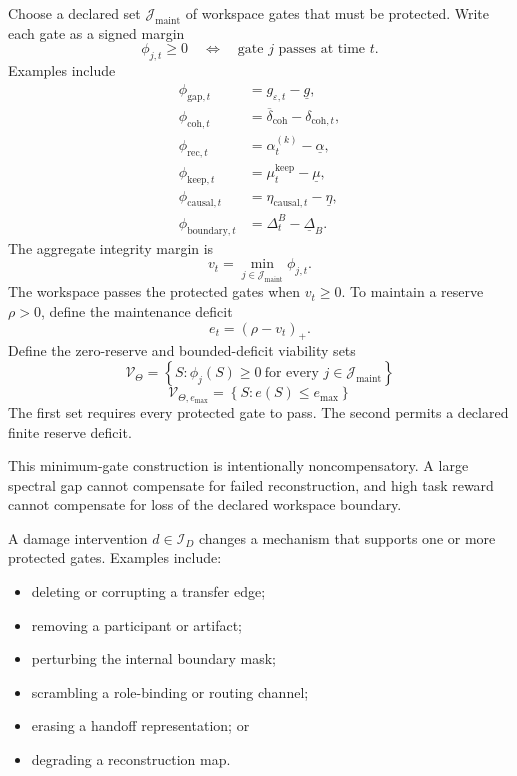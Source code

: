 Choose a declared set \(\mathcal J_{\mathrm{maint}}\) of workspace gates that
must be protected. Write each gate as a signed margin
\[
\phi_{j,t}
\geq0
\quad\Longleftrightarrow\quad
\text{gate }j\text{ passes at time }t.
\]
Examples include
\[
\begin{aligned}
\phi_{\mathrm{gap},t}
&=g_{\varepsilon,t}-\underline g,\\
\phi_{\mathrm{coh},t}
&=\overline\delta_{\mathrm{coh}}-\delta_{\mathrm{coh},t},\\
\phi_{\mathrm{rec},t}
&=\alpha_t^{(k)}-\underline\alpha,\\
\phi_{\mathrm{keep},t}
&=\mu_t^{\mathrm{keep}}-\underline\mu,\\
\phi_{\mathrm{causal},t}
&=\eta_{\mathrm{causal},t}-\underline\eta,\\
\phi_{\mathrm{boundary},t}
&=\Delta_t^B-\underline\Delta_B.
\end{aligned}
\]
The aggregate integrity margin is
\[
\boxed{
v_t
=
\min_{j\in\mathcal J_{\mathrm{maint}}}\phi_{j,t}.
}
\]
The workspace passes the protected gates when \(v_t\geq0\). To maintain a
reserve \(\rho>0\), define the maintenance deficit
\[
\boxed{
e_t
=(\rho-v_t)_+.
}
\]
Define the zero-reserve and bounded-deficit viability sets
\[
\boxed{
\mathcal V_\Theta
=
\left\{
S:\phi_j(S)\geq0\ \text{for every }j\in\mathcal J_{\mathrm{maint}}
\right\}
}
\]
\[
\boxed{
\mathcal V_{\Theta,e_{\max}}
=
\left\{
S:e(S)\leq e_{\max}
\right\}
}
\]
The first set requires every protected gate to pass. The second permits a
declared finite reserve deficit.

This minimum-gate construction is intentionally noncompensatory. A large
spectral gap cannot compensate for failed reconstruction, and high task reward
cannot compensate for loss of the declared workspace boundary.


A damage intervention \(d\in\mathcal I_D\) changes a mechanism that supports
one or more protected gates. Examples include:
\begin{itemize}
\item deleting or corrupting a transfer edge;
\item removing a participant or artifact;
\item perturbing the internal boundary mask;
\item scrambling a role-binding or routing channel;
\item erasing a handoff representation; or
\item degrading a reconstruction map.
\end{itemize}

